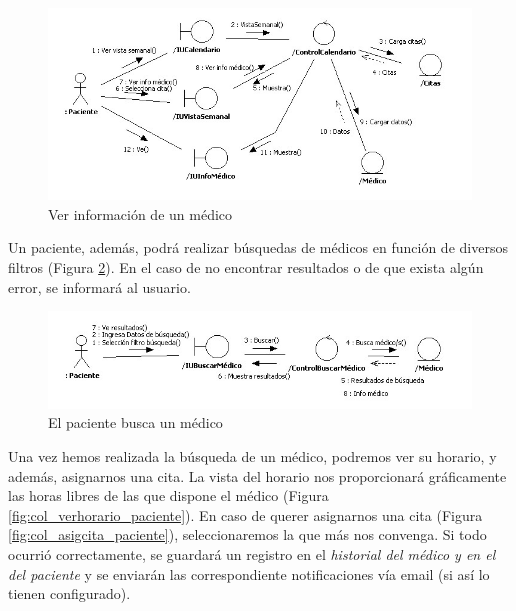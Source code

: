 		\begin{figure}[H]
		  \centering
		    \includegraphics[width=16cm]{img/jpg/colaboraciones/28_VerInfoMedico.jpg}
		  \caption{Ver información de un médico}
		  \label{fig:col_verinfo_medico_paciente}
		\end{figure}
		
		Un paciente, además, podrá realizar búsquedas de médicos en función de diversos filtros (Figura \ref{fig:col_buscarmedico_paciente}). En el caso de no encontrar resultados o de que exista algún error, se informará al usuario.
		
		\begin{figure}[H]
		  \centering
		    \includegraphics[width=16cm]{img/jpg/colaboraciones/29_PacienteBuscarMedico.jpg}
		  \caption{El paciente busca un médico}
		  \label{fig:col_buscarmedico_paciente}
		\end{figure}
		
		\bigskip
		\bigskip
		Una vez hemos realizada la búsqueda de un médico, podremos ver su horario, y además, asignarnos una cita. La vista del horario nos proporcionará gráficamente las horas libres de las que dispone el médico (Figura \ref{fig:col_verhorario_paciente}). En caso de querer asignarnos una cita (Figura \ref{fig:col_asigcita_paciente}), seleccionaremos la que más nos convenga. Si todo ocurrió correctamente, se guardará un registro en el \textit{historial del médico y en el del paciente} y se enviarán las correspondiente notificaciones vía email (si así lo tienen configurado).
		
